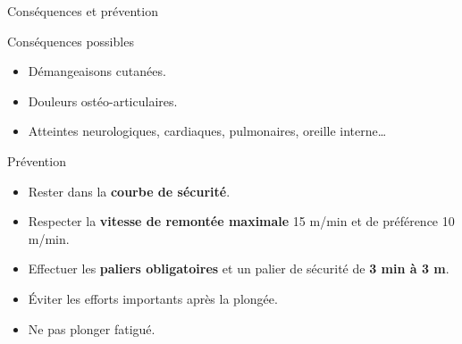 \begin{frame}{Conséquences et prévention}
  \begin{block}{Conséquences possibles}
    \begin{itemize}
      \item Démangeaisons cutanées.
      \item Douleurs ostéo-articulaires.
      \item Atteintes neurologiques, cardiaques, pulmonaires, oreille interne…
    \end{itemize}
  \end{block}

  \begin{block}{Prévention}
    \begin{itemize}
      \item Rester dans la \textbf{courbe de sécurité}.
      \item Respecter la \textbf{vitesse de remontée maximale} 15 m/min et de préférence 10 m/min.
      \item Effectuer les \textbf{paliers obligatoires} et un palier de sécurité
            de \textbf{3 min à 3 m}.
      \item Éviter les efforts importants après la plongée.
      \item Ne pas plonger fatigué.
    \end{itemize}
  \end{block}
\end{frame}
